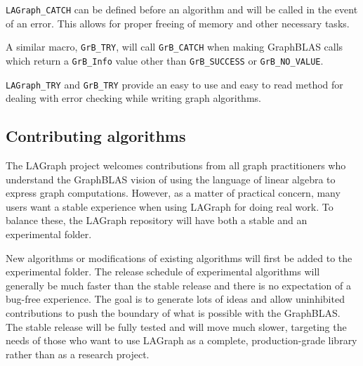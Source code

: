 \verb'LAGraph_CATCH' can be defined before an algorithm and will be called in the event of an error.
This allows for proper freeing of memory and other necessary tasks.

A similar macro, \verb'GrB_TRY', will call \verb'GrB_CATCH' when making GraphBLAS calls which return
a \verb'GrB_Info' value other than \verb'GrB_SUCCESS' or \verb'GrB_NO_VALUE'.

\verb'LAGraph_TRY' and \verb'GrB_TRY' provide an easy to use and easy to read method for dealing with
error checking while writing graph algorithms.


\subsection{Contributing algorithms}

The LAGraph project welcomes contributions from all graph practitioners who understand the GraphBLAS vision
of using the language of linear algebra to express graph computations. However, as a matter of
practical concern, many users want a stable experience when using LAGraph for doing real work. To balance
these, the LAGraph repository will have both a stable and an experimental folder.

New algorithms or modifications of existing algorithms will first be added to the experimental folder.
The release schedule of experimental algorithms will generally be much faster than the stable release
and there is no expectation of a bug-free experience.
The goal is to generate lots of ideas and allow uninhibited contributions to
push the boundary of what is possible with the GraphBLAS. The stable release will be fully tested and
will move much slower, targeting the needs of those who want to use LAGraph as a complete, production-grade
library rather than as a research project.
